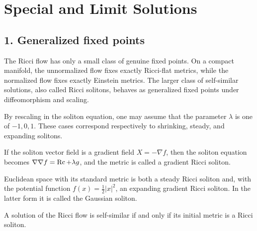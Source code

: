 \chapter{Special and Limit Solutions}

\section*{1. Generalized fixed points}

The Ricci flow has only a small class of genuine fixed points. On a compact
manifold, the unnormalized flow fixes exactly Ricci-flat metrics, while the
normalized flow fixes exactly Einstein metrics. The larger class of
self-similar solutions, also called Ricci solitons, behaves as generalized
fixed points under diffeomorphism and scaling.

\begin{remark}
\label{ch02-rem-self-similar-solutions}
By rescaling in the soliton equation, one may assume that the parameter
\(\lambda\) is one of \(-1,0,1\). These cases correspond respectively to
shrinking, steady, and expanding solitons.
\end{remark}

\begin{remark}
\label{ch02-rem-gradient-solitons}
If the soliton vector field is a gradient field \(X=-\nabla f\), then the
soliton equation becomes \(\nabla\nabla f=\operatorname{Rc}+\lambda g\), and the metric is
called a gradient Ricci soliton.
\end{remark}

\begin{example}
\label{ch02-ex-gaussian-soliton}
Euclidean space with its standard metric is both a steady Ricci soliton and,
with the potential function \(f(x)=\frac12|x|^2\), an expanding gradient Ricci
soliton. In the latter form it is called the Gaussian soliton.
\end{example}

\begin{lemma}
\label{ch02-lem-self-similar-solutions-and-solitons}
A solution of the Ricci flow is self-similar if and only if its initial metric
is a Ricci soliton.
\end{lemma}

